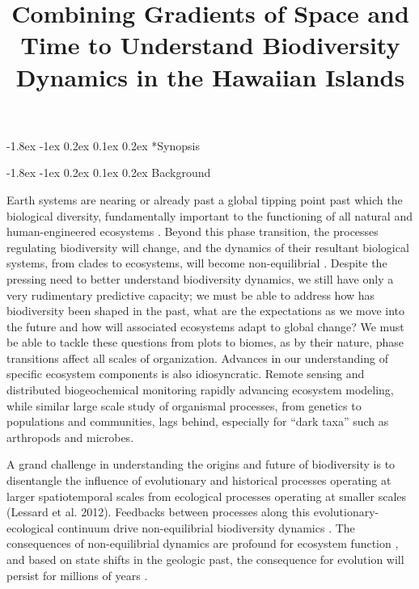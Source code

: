 \documentclass[11pt]{article}
\title{Combining Gradients of Space and Time to Understand Biodiversity Dynamics in the Hawaiian Islands \vspace{-1.5ex}}
\author{}
\date{}
\makeatletter
\renewcommand\section{\@startsection{section}{1}{\z@}%
                                  {-1.8ex \@plus -1ex \@minus 0.2ex}%
                                  {0.1ex \@plus 0.2ex}%
                                  {\normalfont\Large\bfseries}}
\makeatother
\begin{document}
\maketitle
\thispagestyle{fancy} 
\vspace{-4em}


\section*{Synopsis}


\section{Background}

Earth systems are nearing or already past a global tipping point past which the biological diversity, fundamentally important to the functioning of all natural and human-engineered ecosystems \citep{barnosky2012}. Beyond this phase transition, the processes regulating biodiversity will change, and the dynamics of their resultant biological systems, from clades to ecosystems, will become non-equilibrial \citep{barnosky, boettinger}.  Despite the pressing need to better understand biodiversity dynamics, we still have only a very rudimentary predictive capacity; we must be able to address how has biodiversity been shaped in the past, what are the expectations as we move into the future and how will associated ecosystems adapt to global change? We must be able to tackle these questions from plots to biomes, as by their nature, phase transitions affect all scales of organization. Advances in our understanding of specific ecosystem components is also idiosyncratic.  Remote sensing and distributed biogeochemical monitoring \citep{asner, NEON} rapidly advancing ecosystem modeling, while similar large scale study of organismal processes, from genetics to populations and communities, lags behind, especially for ``dark taxa'' such as arthropods and microbes.

A grand challenge in understanding the origins and future of biodiversity is to disentangle the influence of evolutionary and historical processes operating at larger spatiotemporal scales from ecological processes operating at smaller scales (Lessard et al. 2012).  Feedbacks between processes along this evolutionary-ecological continuum drive non-equilibrial biodiversity dynamics \citep{brown1971, ricklefsNeutral, rosindell, rominger2015}. The consequences of non-equilibrial dynamics are profound for ecosystem function \citep{XXX}, and based on state shifts in the geologic past, the consequence for evolution will persist for millions of years \cite{erwin}.
\end{document}
